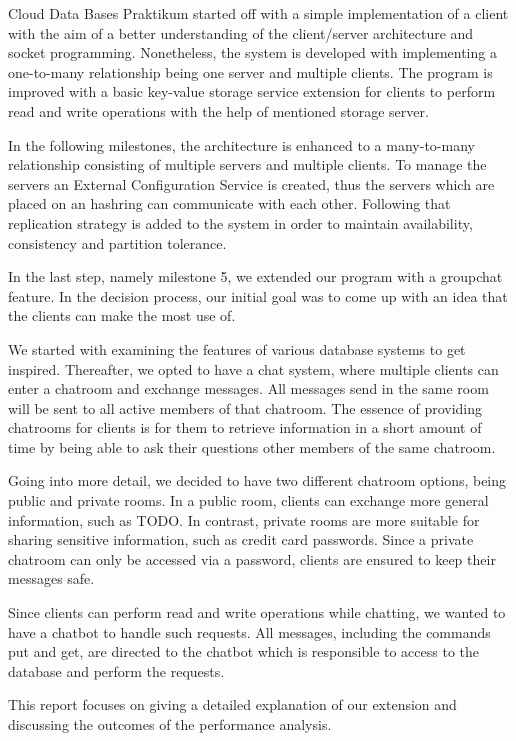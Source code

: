 Cloud Data Bases Praktikum started off with a simple implementation of a client with the aim of a better understanding of the client/server architecture and socket programming. Nonetheless, the system is developed with implementing a one-to-many relationship being one server and multiple clients. The program is improved with a basic key-value storage service extension for clients to perform read and write operations with the help of mentioned storage server. 

In the following milestones, the architecture is enhanced to a many-to-many relationship consisting of multiple servers and multiple clients. To manage the servers an External Configuration Service is created, thus the servers which are placed on an hashring can communicate with each other. Following that replication strategy is added to the system in order to maintain availability, consistency and partition tolerance. 

In the last step, namely milestone 5, we extended our program with a groupchat feature. In the decision process, our initial goal was to come up with an idea that the clients can make the most use of.

We started with examining the features of various database systems to get inspired. Thereafter, we opted to have a chat system, where multiple clients can enter a chatroom and exchange messages. All messages send in the same room will be sent to all active members of that chatroom. The essence of providing chatrooms for clients is for them to retrieve information in a short amount of time by being able to ask their questions other members of the same chatroom. 

Going into more detail, we decided to have two different chatroom options, being public and private rooms. In a public room, clients can exchange more general information, such as TODO. In contrast, private rooms are more suitable for sharing sensitive information, such as credit card passwords. Since a private chatroom can only be accessed via a password, clients are ensured to keep their messages safe.

Since clients can perform read and write operations while chatting, we wanted to have a chatbot to handle such requests. All messages, including the commands put and get, are directed to the chatbot which is responsible to access to the database and perform the requests.
 
This report focuses on giving a detailed explanation of our extension and discussing the outcomes of the performance analysis.
